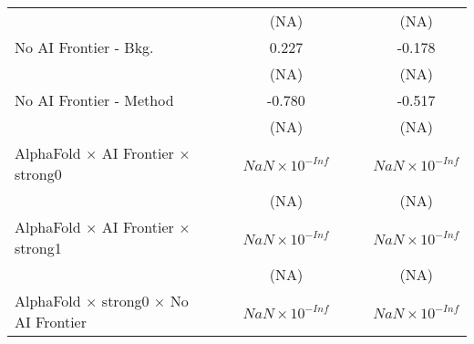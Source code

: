 \begin{tabular}{lcccccc}
                                                                              &                        &                        & (NA)                   &                        &                        & (NA)\\   
   No AI Frontier - Bkg.                                                      &                        &                        & 0.227                  &                        &                        & -0.178\\   
                                                                              &                        &                        & (NA)                   &                        &                        & (NA)\\   
   No AI Frontier - Method                                                    &                        &                        & -0.780                 &                        &                        & -0.517\\   
                                                                              &                        &                        & (NA)                   &                        &                        & (NA)\\   
   AlphaFold $\times$ AI Frontier $\times$ strong0                            &                        &                        & $NaN\times 10^{-Inf}$  &                        &                        & $NaN\times 10^{-Inf}$\\    
                                                                              &                        &                        & (NA)                   &                        &                        & (NA)\\   
   AlphaFold $\times$ AI Frontier $\times$ strong1                            &                        &                        & $NaN\times 10^{-Inf}$  &                        &                        & $NaN\times 10^{-Inf}$\\    
                                                                              &                        &                        & (NA)                   &                        &                        & (NA)\\   
   AlphaFold $\times$ strong0 $\times$ No AI Frontier                         &                        &                        & $NaN\times 10^{-Inf}$  &                        &                        & $NaN\times 10^{-Inf}$\\    

\end{tabular}
